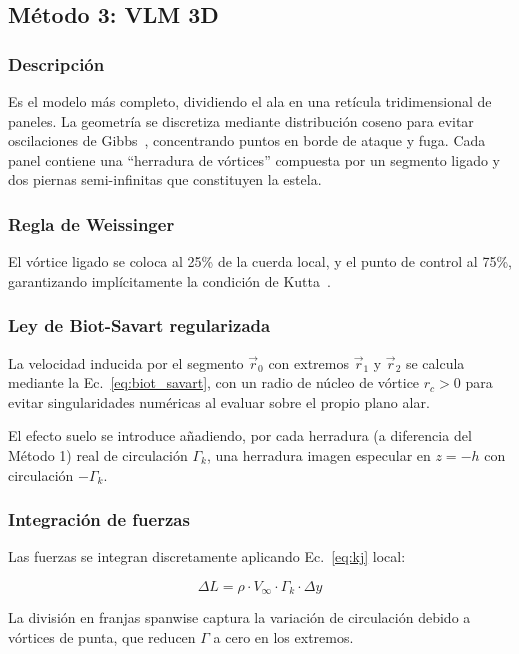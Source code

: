\documentclass[twocolumn]{article}
\begin{document}
\subsection{Método 3: VLM 3D}

\subsubsection{Descripción}
Es el modelo más completo, dividiendo el ala en una retícula tridimensional de paneles. La geometría se discretiza mediante distribución coseno para evitar oscilaciones de Gibbs~\cite{katz2001}, concentrando puntos en borde de ataque y fuga. Cada panel contiene una ``herradura de vórtices'' compuesta por un segmento ligado y dos piernas semi-infinitas que constituyen la estela.

\subsubsection{Regla de Weissinger}
El vórtice ligado se coloca al 25\% de la cuerda local, y el punto de control al 75\%, garantizando implícitamente la condición de Kutta~\cite{weissinger1947}.

\subsubsection{Ley de Biot-Savart regularizada}

La velocidad inducida por el segmento $\vec{r}_0$ con extremos
$\vec{r}_1$ y $\vec{r}_2$ se calcula mediante la
Ec.~\eqref{eq:biot_savart}, con un radio de núcleo de vórtice
$r_c > 0$ para evitar singularidades numéricas al evaluar sobre el
propio plano alar. 

El efecto suelo se introduce añadiendo, por cada herradura (a diferencia del Método 1) real de
circulación $\Gamma_k$, una herradura imagen especular en $z = -h$
con circulación $-\Gamma_k$.

\subsubsection{Integración de fuerzas}
Las fuerzas se integran discretamente aplicando Ec.~\eqref{eq:kj} local:

\begin{equation}
\Delta L = \rho \cdot V_{\infty} \cdot \Gamma_k \cdot \Delta y
\label{eq:M3_L}
\end{equation}

La división en franjas spanwise captura la variación de circulación debido a vórtices de punta, que reducen $\Gamma$ a cero en los extremos.
\end{document}
